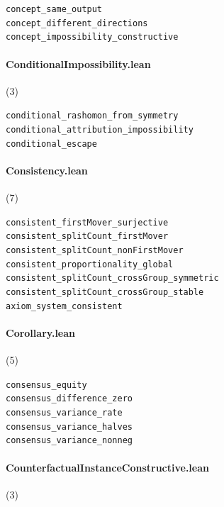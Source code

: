 {\footnotesize
\texttt{concept\_same\_output}\\
\texttt{concept\_different\_directions}\\
\texttt{concept\_impossibility\_constructive}\\
}

\paragraph{ConditionalImpossibility.lean} (3)

{\footnotesize
\texttt{conditional\_rashomon\_from\_symmetry}\\
\texttt{conditional\_attribution\_impossibility}\\
\texttt{conditional\_escape}\\
}

\paragraph{Consistency.lean} (7)

{\footnotesize
\texttt{consistent\_firstMover\_surjective}\\
\texttt{consistent\_splitCount\_firstMover}\\
\texttt{consistent\_splitCount\_nonFirstMover}\\
\texttt{consistent\_proportionality\_global}\\
\texttt{consistent\_splitCount\_crossGroup\_symmetric}\\
\texttt{consistent\_splitCount\_crossGroup\_stable}\\
\texttt{axiom\_system\_consistent}\\
}

\paragraph{Corollary.lean} (5)

{\footnotesize
\texttt{consensus\_equity}\\
\texttt{consensus\_difference\_zero}\\
\texttt{consensus\_variance\_rate}\\
\texttt{consensus\_variance\_halves}\\
\texttt{consensus\_variance\_nonneg}\\
}

\paragraph{CounterfactualInstanceConstructive.lean} (3)

